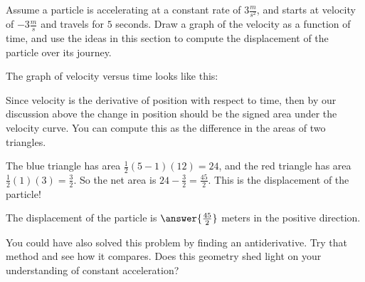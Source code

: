 \documentclass{ximera}
\begin{document}
\begin{question}
Assume a particle is accelerating at a constant rate of $3 \frac{m}{s^2}$, and starts at velocity of $-3 \frac{m}{s}$ and travels for $5$ seconds.  Draw a graph of the velocity as a function of time, and use the ideas in this section to compute the displacement of the particle over its journey.

\begin{hint}
	The graph of velocity versus time looks like this:

\begin{image}
\end{image}
	
\end{hint}

\begin{hint}
	Since velocity is the derivative of position with respect to time, then by our discussion above the change in position should be the signed area under the velocity curve.  You can compute this as the difference in the areas of two triangles.
\end{hint}

\begin{hint}
	The blue triangle has area $\frac{1}{2}(5-1)(12) = 24$, and the red triangle has area $\frac{1}{2}(1)(3) = \frac{3}{2}$.  So the net area is $24-\frac{3}{2} = \frac{45}{2}$.  This is the displacement of the particle!
\end{hint}

The displacement of the particle is $\answer{\frac{45}{2}}$ meters in the positive direction.

\begin{feedback}
You could have also solved this problem by finding an antiderivative.  Try that method and see how it compares.  Does this geometry shed light on your understanding of constant acceleration?
\end{feedback}
\end{question}


  
\end{document}
